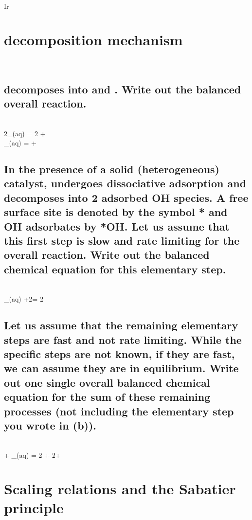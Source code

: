 Ir\documentclass{article}
\begin{document}
\section{ decomposition mechanism}
\\
\subsection{ decomposes into  and . Write out the balanced overall
reaction.}
\\ 2_{(aq)} = 2 + 
\\ _{(aq)} =  + 

\subsection{In the presence of a solid (heterogeneous) catalyst,  undergoes
dissociative adsorption and decomposes into 2 adsorbed OH species. A free
surface site is denoted by the symbol * and OH adsorbates by *OH. Let us
assume that this first step is slow and rate limiting for the overall reaction. Write
out the balanced chemical equation for this elementary step.}

\\ _{(aq)} +2\ast =  2
\subsection{Let us assume that the remaining elementary steps are fast and not rate
limiting. While the specific steps are not known, if they are fast, we can assume
they are in equilibrium. Write out one single overall balanced chemical
equation for the sum of these remaining processes (not including the
elementary step you wrote in (b)).}

\\ + _{(aq)} = 2 + 2\ast + 

\section{Scaling relations and the Sabatier principle}
\end{document}
